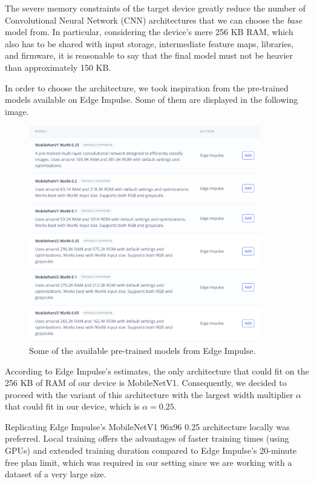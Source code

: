 \documentclass{Configuration_Files/PoliMi3i_thesis}
\begin{document}
The severe memory constraints of the target device greatly reduce the number of Convolutional Neural Network (CNN) architectures that we can choose the \textit{base} model from. In particular, considering the device's mere 256 KB RAM, which also has to be shared with input storage, intermediate feature maps, libraries, and firmware, it is reasonable to say that the final model must not be heavier than approximately 150 KB. 

In order to choose the architecture, we took inspiration from the pre-trained models available on Edge Impulse. Some of them are displayed in the following image.

\begin{figure}[H]
    \centering
    \includegraphics[width=0.9\textwidth]{Figures/edge_impulse_models.png}
    \caption{Some of the available pre-trained models from Edge Impulse.}
    \label{fig:ei_models}
\end{figure}

According to Edge Impulse's estimates, the only architecture that could fit on the 256 KB of RAM of our device is MobileNetV1. Consequently, we decided to proceed with the variant of this architecture with the largest width multiplier $\alpha$ that could fit in our device, which is $\alpha = 0.25$.

Replicating Edge Impulse's MobileNetV1 96x96 0.25 architecture locally was preferred. Local training offers the advantages of faster training times (using GPUs) and extended training duration compared to Edge Impulse's 20-minute free plan limit, which was required in our setting since we are working with a dataset of a very large size.
\end{document}
